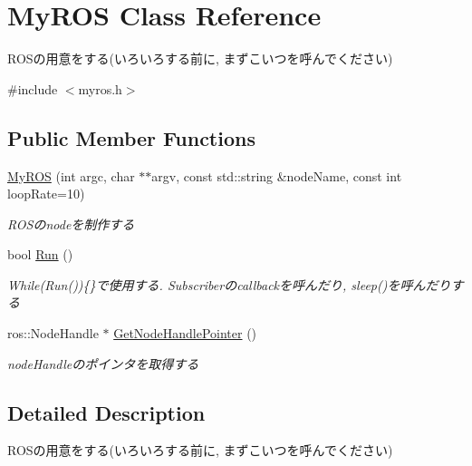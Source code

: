 \hypertarget{classMyROS}{\section{My\-R\-O\-S Class Reference}
\label{classMyROS}
}


R\-O\-Sの用意をする(いろいろする前に, まずこいつを呼んでください)  




{\ttfamily \#include $<$myros.\-h$>$}

\subsection*{Public Member Functions}
\begin{DoxyCompactItemize}
\item 
\hyperlink{classMyROS_a91b0b89df5d4f6ac41617f31b2c9e45a}{My\-R\-O\-S} (int argc, char $\ast$$\ast$argv, const std\-::string \&node\-Name, const int loop\-Rate=10)
\begin{DoxyCompactList}\small\item\em R\-O\-Sのnodeを制作する \end{DoxyCompactList}\item 
bool \hyperlink{classMyROS_a3d02355a40459662ab08fff297dcd158}{Run} ()
\begin{DoxyCompactList}\small\item\em While(\-Run())\{\}で使用する. Subscriberのcallbackを呼んだり, sleep()を呼んだりする \end{DoxyCompactList}\item 
ros\-::\-Node\-Handle $\ast$ \hyperlink{classMyROS_ab67396c1306412fb9df816f3c3dc091e}{Get\-Node\-Handle\-Pointer} ()
\begin{DoxyCompactList}\small\item\em node\-Handleのポインタを取得する \end{DoxyCompactList}\end{DoxyCompactItemize}


\subsection{Detailed Description}
R\-O\-Sの用意をする(いろいろする前に, まずこいつを呼んでください) 

